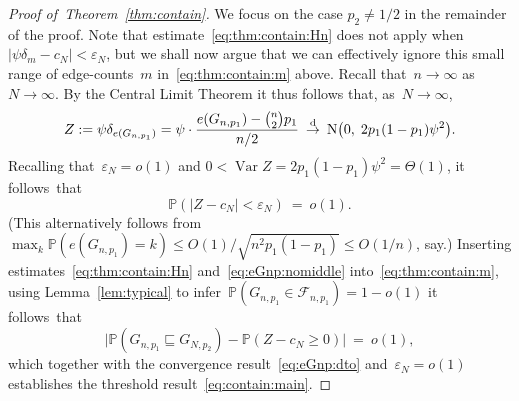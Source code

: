 \documentclass{article}
\newcommand{\eps}{\varepsilon}
\renewcommand{\Pr}{\mathbb{P}}
\newcommand{\cF}{\mathcal{F}}
\newcommand\Var{\operatorname{Var}}
\newcommand{\isub}{\sqsubseteq}
\newcommand\bigpar[1]{\bigl(#1\bigr)}
\newcommand\bigabs[1]{\bigl|#1\bigr|}
\newcommand{\refT}[1]{Theorem~\ref{#1}}
\newcommand{\refL}[1]{Lemma~\ref{#1}}
\newcommand\dto{\overset{\mathrm{d}}{\to}}
\newcommand\Nor{\mathrm{N}}
\begin{document}
\begin{proof}[Proof of~\refT{thm:contain}]
We focus on the case $p_2\neq1/2$ in the remainder of the proof.
Note that  estimate~\eqref{eq:thm:contain:Hn} does not apply when 
$|\psi\delta_{m}-c_N|< \eps_N$, but we shall now argue that we can effectively ignore this small range of edge-counts~$m$ in~\eqref{eq:thm:contain:m} above. Recall that~$n \to \infty$ as~$N \to \infty$. 
By the Central Limit Theorem it thus follows that, as~$N \to \infty$,  \begin{equation}\label{eq:eGnp:dto}
Z := \psi\delta_{e(G_{n,p_1})} = \psi\cdot \frac{e(G_{n,p_1})-\tbinom{n}{2}p_1}{n/2}
 \: \dto \: \Nor\bigpar{0, \; 2p_1(1-p_1)\psi^2} .
\end{equation}
Recalling that~$\eps_N = o(1)$ and $0 < \Var Z = 2p_1(1-p_1)\psi^2=\Theta(1)$, it follows~that
\begin{equation}\label{eq:eGnp:nomiddle}
\Pr(| Z-c_N| <  \eps_N) \: = \: o(1) .
\end{equation}
(This alternatively follows from~$\max_k\Pr(e(G_{n,p_1})=k) \le O(1)/\sqrt{n^2p_1(1-p_1)} \le O(1/n)$, say.)
Inserting estimates~\eqref{eq:thm:contain:Hn} and~\eqref{eq:eGnp:nomiddle} into~\eqref{eq:thm:contain:m}, using \refL{lem:typical} to infer~$\Pr(G_{n,p_1} \in \cF_{n,p_1})=1-o(1)$  
it follows~that 
\begin{equation}\label{eq:thm:contain}
\bigabs{\Pr(G_{n,p_1} \isub G_{N,p_2}) - \Pr(Z-c_N \ge 0)} \:  = \: o(1),
\end{equation}
which together with the convergence result~\eqref{eq:eGnp:dto} and~${\eps_N =o(1)}$
establishes the threshold result~\eqref{eq:contain:main}.
\end{proof}
\end{document}
